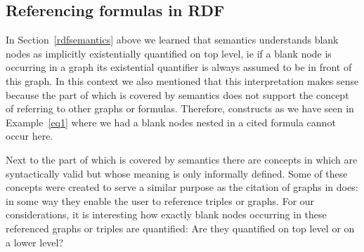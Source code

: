 \subsection{Referencing formulas in RDF}
In Section~\ref{rdfsemantics} above  we learned that \rdf semantics understands blank nodes as implicitly existentially quantified on top level, ie if a blank node is occurring in a graph 
its existential quantifier is always assumed to be in front of this graph. In this context we also mentioned that this interpretation makes sense 
because the part of \rdf which is covered
by \rdf semantics does not support the concept of referring to other graphs or formulas. Therefore, constructs as we have seen in Example~\ref{eq1} where we had a blank nodes nested in a
cited formula cannot occur here. 

Next to the  part of \rdf which is covered by \rdf semantics there are concepts in \rdf which are syntactically valid but whose meaning is only informally defined. Some of these 
concepts were created to serve a similar purpose as the citation of graphs in \nthree does: in some way they enable the user to reference triples or graphs. 
For our considerations, it is interesting how exactly blank nodes occurring in these referenced graphs or triples are quantified:
Are they quantified on top level or on a lower level? 

